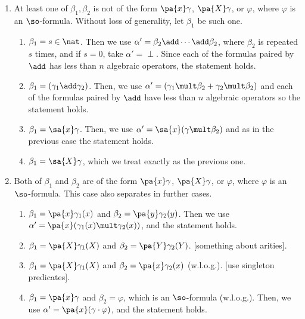 \begin{enumerate}

	\item At least one of $\beta_1, \beta_2$ is not of the form $\pa{x} \gamma$, $\pa{X} \gamma$, or $\varphi$, where $\varphi$ is an $\so$-formula. Without loss of generality, let $\beta_1$ be such one.

	\begin{enumerate}

		\item $\beta_1 = s \in \nat$. Then we use $\alpha' = \beta_2 \add \cdots \add \beta_2$, where $\beta_2$ is repeated $s$ times, and if $s = 0$, take $\alpha' = \perp$. Since each of the formulas paired by $\add$ has less than $n$ algebraic operators, the statement holds.

		\item $\beta_1 = (\gamma_1 \add \gamma_2)$. Then, we use $\alpha' = (\gamma_1\mult\beta_2 + \gamma_2\mult\beta_2)$ and each of the formulas paired by $\add$ have less than $n$ algebraic operators so the statement holds.

		\item $\beta_1 = \sa{x} \gamma$. Then, we use $\alpha' = \sa{x} (\gamma\mult\beta_2)$ and as in the previous case the statement holds.

		\item $\beta_1 = \sa{X} \gamma$, which we treat exactly as the previous one.

	\end{enumerate}

	\item Both of $\beta_1$ and $\beta_2$ are of the form $\pa{x} \gamma$, $\pa{X} \gamma$, or $\varphi$, where $\varphi$ is an $\so$-formula. This case also separates in further cases.

	\begin{enumerate}

		\item $\beta_1 = \pa{x} \gamma_1(x)$ and $\beta_2 = \pa{y} \gamma_2(y)$. Then we use $\alpha' = \pa{x}(\gamma_1(x)\mult\gamma_2(x))$, and the statement holds.

		\item $\beta_1 = \pa{X} \gamma_1(X)$ and $\beta_2 = \pa{Y} \gamma_2(Y)$. [something about arities].

		\item $\beta_1 = \pa{X} \gamma_1(X)$ and $\beta_2 = \pa{x} \gamma_2(x)$ (w.l.o.g.). [use singleton predicates].

		\item $\beta_1 = \pa{x} \gamma$ and $\beta_2 = \varphi$, which is an $\so$-formula (w.l.o.g.). Then, we use $\alpha' = \pa{x} (\gamma \cdot \varphi)$, and the statement holds.


\end{enumerate}
\end{enumerate}
